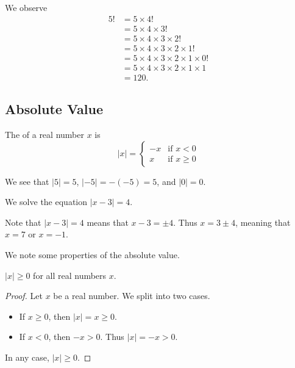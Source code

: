 \begin{example}
    We observe
    \begin{align*}
        5! &= 5 \times 4!\\
        &= 5 \times 4 \times 3!\\
        &= 5 \times 4 \times 3 \times 2!\\
        &= 5 \times 4 \times 3 \times 2 \times 1!\\
        &= 5 \times 4 \times 3 \times 2 \times 1 \times 0!\\
        &= 5 \times 4 \times 3 \times 2  \times 1  \times 1\\
        &= 120.
    \end{align*}
\end{example}

\subsection{Absolute Value}
\begin{definition}
    The  of a real number $x$ is
    \[
        |x| = \begin{cases}
            -x & \text{if } x < 0\\
            x & \text{if } x \geq 0
        \end{cases}
    \]
\end{definition}

\begin{example}
    We see that $|5| = 5$, $|-5| = -(-5) = 5$, and $|0| = 0$.
\end{example}

\begin{example}
    We solve the equation $|x-3| = 4$.

    Note that $|x-3| = 4$ means that $x-3 = \pm 4$. Thus $x = 3 \pm 4$, meaning that $x = 7$ or $x = -1$.
\end{example}

We note some properties of the absolute value.

\begin{proposition}
    $|x| \geq 0$ for all real numbers $x$.
\end{proposition}
\begin{proof}
    Let $x$ be a real number. We split into two cases.
    \begin{itemize}
        \item If $x \geq 0$, then $|x| = x \geq 0$.
        \item If $x < 0$, then $-x > 0$. Thus $|x| = -x > 0$.
    \end{itemize}
    In any case, $|x| \geq 0$.
\end{proof}

